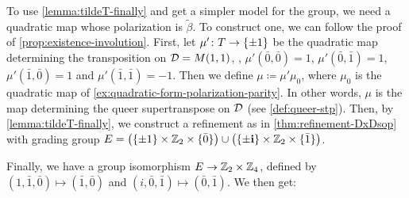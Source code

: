 To use \cref{lemma:tildeT-finally} and get a simpler model for the group, we need a quadratic map whose polarization is $\tilde\beta$. 
To construct one, we can follow the proof of \cref{prop:existence-involution}. 
First, let $\mu'\colon T \to \{ \pm 1 \}$ be the quadratic map determining the transposition on $\mathcal{D} = M(1,1)$, \ie, $\mu'(\bar 0, \bar 0) = 1$, $\mu'(\bar 0, \bar 1) = 1$, $\mu'(\bar 1, \bar 0) = 1$ and $\mu'(\bar 1, \bar 1) = -1$. 
Then we define $\mu \coloneqq \mu' \mu_0$, where $\mu_0$ is the quadratic map of \cref{ex:quadratic-form-polarization-parity}. 
In other words, $\mu$ is the map determining the queer supertranspose on $\mathcal{D}$ (see \cref{def:queer-stp}). 
Then, by \cref{lemma:tildeT-finally}, we construct a refinement as in \cref{thm:refinement-DxDsop} with grading group $E = \big(\{ \pm 1 \} \times \mathbb{Z}_2 \times \{ \bar 0 \} \big) \cup \big(\{\pm \mathbf{i} \} \times \mathbb{Z}_2 \times \{ \bar 1 \} \big)$. 

Finally, we have a group isomorphism $E \to \mathbb{Z}_2 \times \mathbb{Z}_4$, defined by $(1, \bar 1, \bar 0) \mapsto (\bar 1, \bar 0)$ and $(i, \bar 0, \bar 1) \mapsto (\bar 0, \bar 1)$. 
We then get: 

